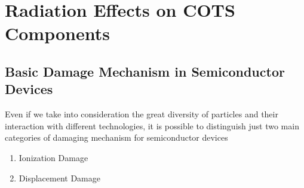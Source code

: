 \documentclass[./dissertation.tex]{subfiles}
\begin{document}
\section{Radiation Effects on COTS Components}
\subsection{Basic Damage Mechanism in Semiconductor Devices}
Even if we take into consideration the great diversity of particles and their interaction with different technologies, it is possible to distinguish just two main categories of damaging mechanism for semiconductor devices
\begin{enumerate}
    \item Ionization Damage
    \item Displacement Damage
\end{enumerate}
\end{document}
